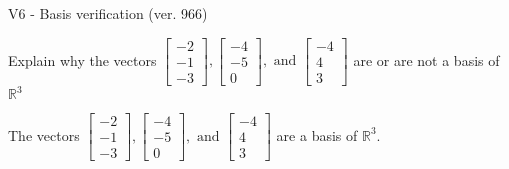 \begin{exercise}
  \begin{exerciseTitle}V6 - Basis verification (ver. 966)\end{exerciseTitle}
  \begin{exerciseStatement}
    Explain why the vectors \(\left[\begin{array}{r}
-2 \\
-1 \\
-3
\end{array}\right] , \left[\begin{array}{r}
-4 \\
-5 \\
0
\end{array}\right] , \text{ and } \left[\begin{array}{r}
-4 \\
4 \\
3
\end{array}\right]\) are or are not a basis of \(\mathbb{R}^3\)	


  \end{exerciseStatement}
  \begin{exerciseAnswer}
   The vectors \(\left[\begin{array}{r}
-2 \\
-1 \\
-3
\end{array}\right] , \left[\begin{array}{r}
-4 \\
-5 \\
0
\end{array}\right] , \text{ and } \left[\begin{array}{r}
-4 \\
4 \\
3
\end{array}\right]\) 
  	 are  a basis of \(\mathbb{R}^3\).
  


  \end{exerciseAnswer}
\end{exercise}